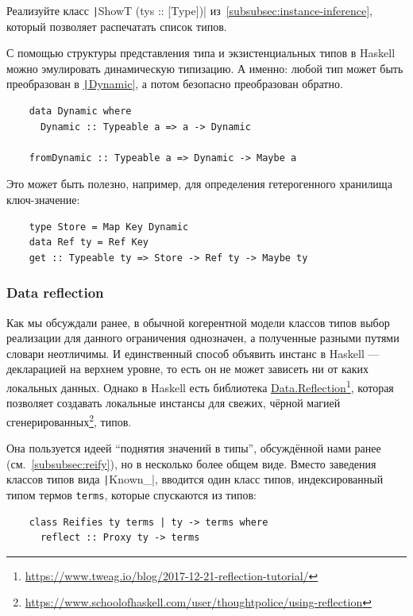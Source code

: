 \begin{task}
    Реализуйте класс \texttt|ShowT (tys :: [Type])| из~\ref{subsubsec:instance-inference}, который позволяет распечатать список типов.
\end{task}

С помощью структуры представления типа и экзистенциальных типов в Haskell можно эмулировать динамическую типизацию.
А именно: любой тип может быть преобразован в \href{https://hackage.haskell.org/package/base/docs/Data-Dynamic.html}{\texttt|Dynamic|}, а потом безопасно преобразован обратно.
\begin{verbatim}
    data Dynamic where
      Dynamic :: Typeable a => a -> Dynamic

    fromDynamic :: Typeable a => Dynamic -> Maybe a
\end{verbatim}

Это может быть полезно, например, для определения гетерогенного хранилища ключ-значение:
\begin{verbatim}
    type Store = Map Key Dynamic
    data Ref ty = Ref Key
    get :: Typeable ty => Store -> Ref ty -> Maybe ty
\end{verbatim}

\subsubsection{Data reflection} \label{subsubsec:data-reflection}

Как мы обсуждали ранее, в обычной когерентной модели классов типов выбор реализации для данного ограничения однозначен, а полученные разными путями словари неотличимы.
И единственный способ объявить инстанс в Haskell --- декларацией на верхнем уровне, то есть он не может зависеть ни от каких локальных данных.
Однако в Haskell есть библиотека \href{https://hackage.haskell.org/package/reflection-2.1.6/docs/Data-Reflection.html}{Data.Reflection}\footnote{\url{https://www.tweag.io/blog/2017-12-21-reflection-tutorial/}}, которая позволяет создавать локальные инстансы для свежих, чёрной магией сгенерированных\footnote{\url{https://www.schoolofhaskell.com/user/thoughtpolice/using-reflection}}, типов.

Она пользуется идеей ``поднятия значений в типы'', обсуждённой нами ранее (см.~\ref{subsubsec:reify}), но в несколько более общем виде.
Вместо заведения классов типов вида \texttt|Known_|, вводится один класс типов, индексированный типом термов \texttt{terms}, которые спускаются из типов:
\begin{verbatim}
    class Reifies ty terms | ty -> terms where
      reflect :: Proxy ty -> terms
\end{verbatim}

